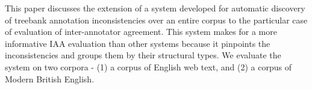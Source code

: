 This paper discusses the extension of a system developed for automatic discovery of
 treebank annotation inconsistencies over an entire corpus to the particular
 case of evaluation of
 inter-annotator agreement.
 This system makes for a more informative IAA evaluation than other systems
 because it pinpoints the
 inconsistencies and groups them by their structural types. 
  We evaluate the system on two corpora - (1) a corpus of
 English web text, and (2) a corpus of Modern British English.

